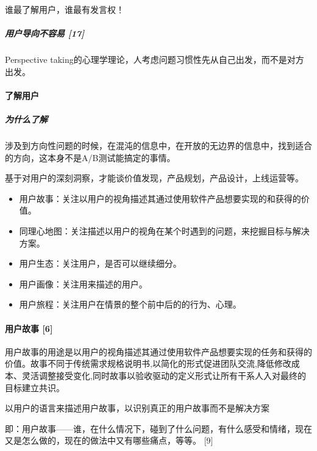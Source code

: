 \documentclass[letterpaper,11pt,english]{sphinxmanual}
\begin{document}
谁最了解用户，谁最有发言权！


\subparagraph{用户导向不容易 {[}17{]}}
\label{\detokenize{chapter_knowledge/users_analysis:id6}}
Perspective
taking的心理学理论，人考虑问题习惯性先从自己出发，而不是对方出发。


\paragraph{了解用户}
\label{\detokenize{chapter_knowledge/users_analysis:id7}}

\subparagraph{为什么了解}
\label{\detokenize{chapter_knowledge/users_analysis:id8}}
涉及到方向性问题的时候，在混沌的信息中，在开放的无边界的信息中，找到适合的方向，这本身不是A/B测试能搞定的事情。

基于对用户的深刻洞察，才能谈价值发现，产品规划，产品设计，上线运营等。

\begin{itemize}
\item {} 
用户故事：关注以用户的视角描述其通过使用软件产品想要实现的和获得的价值。

\item {} 
同理心地图：关注描述以用户的视角在某个时遇到的问题，来挖掘目标与解决方案。

\item {} 
用户生态：关注用户，是否可以继续细分。

\item {} 
用户画像：关注用来描述的用户。

\item {} 
用户旅程：关注用户在情景的整个前中后的的行为、心理。

\end{itemize}


\paragraph{用户故事 {[}6{]}}
\label{\detokenize{chapter_knowledge/users_analysis:id9}}
用户故事的用途是以用户的视角描述其通过使用软件产品想要实现的任务和获得的价值。故事不同于传统需求规格说明书,以简化的形式促进团队交流,降低修改成本、灵活调整接受变化,同时故事以验收驱动的定义形式让所有干系人入对最终的目标建立共识。

以用户的语言来描述用户故事，以识别真正的用户故事而不是解决方案

即：用户故事——谁，在什么情况下，碰到了什么问题，有什么感受和情绪，现在又是怎么做的，现在的做法中又有哪些痛点，等等。
{[}9{]}
\end{document}
